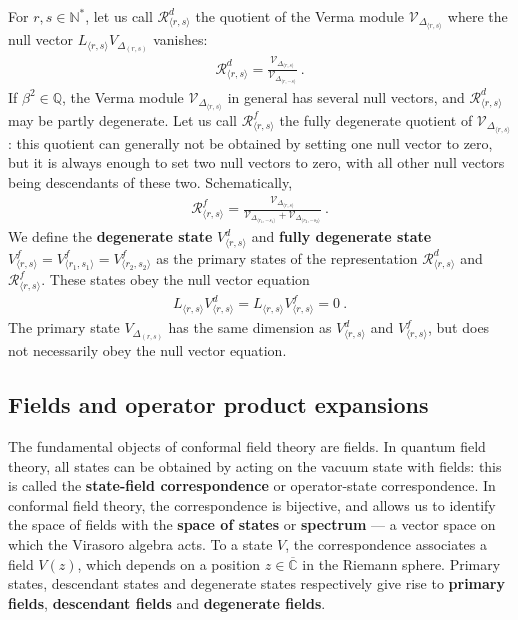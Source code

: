 \documentclass[12pt, a4paper]{article}
\theoremstyle{break}
\begin{document}
For $r,s\in\mathbb{N}^*$, let us call $\mathcal{R}^d_{\langle r,s\rangle}$ the quotient of the Verma module $\mathcal{V}_{\Delta_{\langle r,s\rangle}}$ where the null vector $L_{\langle r,s\rangle}V_{\Delta_{(r,s)}}$ vanishes:
\begin{align}
 \mathcal{R}^d_{\langle r,s\rangle} 
 =\frac{\mathcal{V}_{\Delta_{\langle r,s\rangle}}}{\mathcal{V}_{\Delta_{\langle r,-s\rangle}}}\ . 
 \label{rvv}
\end{align}
If $\beta^2\in \mathbb{Q}$, the Verma module $\mathcal{V}_{\Delta_{\langle r,s\rangle}}$ in general has several null vectors, and $\mathcal{R}^d_{\langle r,s\rangle}$ may be partly degenerate. Let us call $\mathcal{R}^f_{\langle r,s\rangle}$ the fully degenerate quotient of  $\mathcal{V}_{\Delta_{\langle r,s\rangle}}$: this quotient can generally not be obtained by setting one null vector to zero, but it is always enough to set two null vectors to zero, with all other null vectors being descendants of these two. Schematically,
\begin{align}
 \mathcal{R}^f_{\langle r,s\rangle} = \frac{\mathcal{V}_{\Delta_{\langle r,s\rangle}}}{\mathcal{V}_{\Delta_{\langle r_1,-s_1\rangle}}+ \mathcal{V}_{\Delta_{\langle r_2,-s_2\rangle}}}\ .
\end{align}
We define the \textbf{degenerate state} $V^d_{\langle r,s\rangle}$ and \textbf{fully degenerate state} $V^f_{\langle r,s\rangle}=V^f_{\langle r_1,s_1\rangle}=V^f_{\langle r_2,s_2\rangle}$ as the primary states of the representation $\mathcal{R}^d_{\langle r,s\rangle}$ and 
$\mathcal{R}^f_{\langle r,s\rangle}$. These states obey the null vector equation
\begin{align}
L_{\langle r, s\rangle} V^d_{\langle r,s\rangle} = L_{\langle r, s\rangle} V^f_{\langle r,s\rangle} = 0\ .
\end{align}
The primary state $V_{\Delta_{(r,s)}}$ has the same dimension as $V^d_{\langle r,s\rangle}$ and $V^f_{\langle r,s\rangle}$, but does not necessarily obey the null vector equation. 

\subsection{Fields and operator product expansions}\label{sec:fope}

The fundamental objects of conformal field theory are fields. In quantum field theory, all states can be obtained by acting on the vacuum state with fields: this is called the \textbf{state-field correspondence} or operator-state correspondence. In conformal field theory, the correspondence is bijective, and allows us to identify the space of fields with the \textbf{space of states} or \textbf{spectrum}  --- a vector space on which the Virasoro algebra acts. To a state $V$, the correspondence associates a field $V(z)$, which depends on a position $z\in\overline{\mathbb{C}}$ in the Riemann sphere. Primary states, descendant states and degenerate states respectively give rise to \textbf{primary fields}, \textbf{descendant fields} and \textbf{degenerate fields}.
\end{document}
